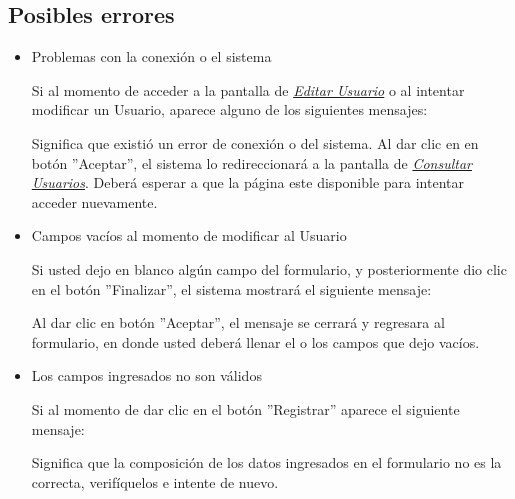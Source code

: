                 \subsection{Posibles errores}
                    \begin{itemize}
                        \item Problemas con la conexión o el sistema
                    
                            Si al momento de acceder a la pantalla de \hyperlink{editarUs}{\textit{Editar Usuario}} o al intentar modificar un Usuario, aparece alguno de los siguientes mensajes:
                        
                            Significa que existió un error de conexión o del sistema. Al dar clic en en botón ''Aceptar'', el sistema lo redireccionará  a la pantalla de \hyperlink{consultarUs}{\textit{Consultar Usuarios}}. Deberá esperar a que la página este disponible para intentar acceder nuevamente.
                    
                        \item Campos vacíos al momento de modificar al Usuario
                    
                            Si usted dejo en blanco algún campo del formulario, y posteriormente dio clic en el botón ''Finalizar'', el sistema mostrará el siguiente mensaje:
                        
                            Al dar clic en botón ''Aceptar'', el mensaje se cerrará y regresara al formulario, en donde usted deberá llenar el o los campos que dejo vacíos. 
                
                        \item Los campos ingresados no son válidos
                        
                            Si al momento de dar clic en el botón ''Registrar'' aparece el siguiente mensaje:
                        
                            Significa que la composición de los datos ingresados en el formulario no es la correcta, verifíquelos e intente de nuevo.
                    
                    \end{itemize}